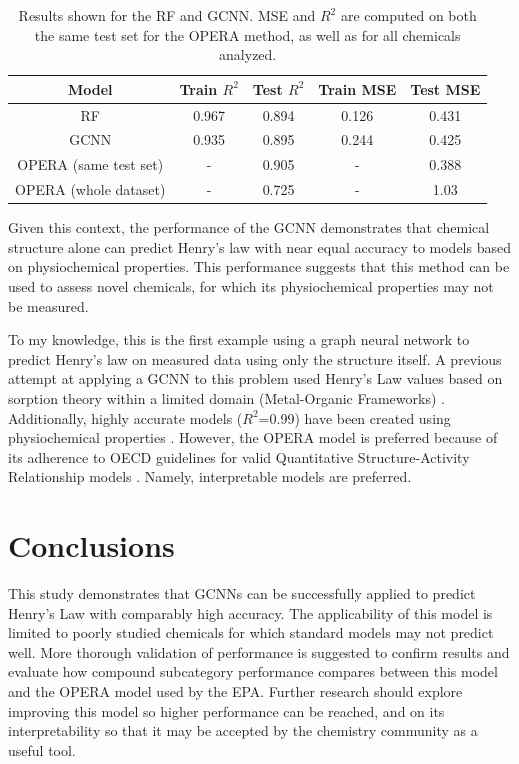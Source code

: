 \documentclass[12pt, oneside]{article}   	%
\begin{document}
\begin{table}[!h]
   \centering
   \begin{tabular}{c c c c c} %
      \toprule
      Model    & Train $R^2$ & Test $R^2$ & Train MSE & Test MSE \\
      \midrule
      RF    & 0.967 & 0.894 & 0.126 & 0.431 \\
      GCNN & 0.935 & 0.895 & 0.244 & 0.425 \\
      OPERA (same test set) & - & 0.905 & - & 0.388 \\
      OPERA (whole dataset) & - & 0.725 & - & 1.03 \\
      \bottomrule
   \end{tabular}
   \caption{Results shown for the RF and GCNN. MSE and $R^2$ are computed on both the same test set for the OPERA method, as well as for all chemicals analyzed.}
   \label{tab:results}
\end{table}

Given this context, the performance of the GCNN demonstrates that chemical structure alone can predict Henry's law with near equal accuracy to models based on physiochemical properties. This performance suggests that this method can be used to assess novel chemicals, for which its physiochemical properties may not be measured.

To my knowledge, this is the first example using a graph neural network to predict Henry's law on measured data using only the structure itself. A previous attempt at applying a GCNN to this problem used Henry's Law values based on sorption theory within a limited domain (Metal-Organic Frameworks) \cite{zhang2021}. Additionally, highly accurate models ($R^2$=0.99) have been created using physiochemical properties \cite{English2001}. However, the OPERA model is preferred because of its adherence to OECD guidelines for valid Quantitative Structure-Activity Relationship models \cite{oecd2014}. Namely, interpretable models are preferred.

\section{Conclusions}
This study demonstrates that GCNNs can be successfully applied to predict Henry's Law with comparably high accuracy. The applicability of this model is limited to poorly studied chemicals for which standard models may not predict well. More thorough validation of performance is suggested to confirm results and evaluate how compound subcategory performance compares between this model and the OPERA model used by the EPA. Further research should explore improving this model so higher performance can be reached, and on its interpretability so that it may be accepted by the chemistry community as a useful tool.
\end{document}
